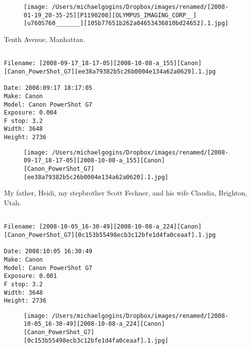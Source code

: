\documentclass[11pt,letter,DIV=14,paper=landscape]{scrbook}
\begin{document}
\begin{figure}
\texttt{[image: /Users/michaelgogins/Dropbox/images/renamed/[2008-01-19\_20-35-25][P1190200][OLYMPUS\_IMAGING\_CORP\_\_][u760S760\_\_\_\_\_\_\_][105b77651b262a04653436810bd24652].1.jpg]}
\end{figure}
    
\clearpage
\noindent Tenth Avenue, Manhattan.
\noindent
\begin{lstlisting}

Filename: [2008-09-17_18-17-05][2008-10-08-a_155][Canon][Canon_PowerShot_G7][ee38a79382b5c26b0004e134a62a0620].1.jpg

Date: 2008:09:17 18:17:05
Make: Canon
Model: Canon PowerShot G7
Exposure: 0.004
F stop: 3.2
Width: 3648
Height: 2736
\end{lstlisting}
\clearpage

\begin{figure}
\texttt{[image: /Users/michaelgogins/Dropbox/images/renamed/[2008-09-17\_18-17-05][2008-10-08-a\_155][Canon][Canon\_PowerShot\_G7][ee38a79382b5c26b0004e134a62a0620].1.jpg]}
\end{figure}
    
\clearpage
\noindent My father, Heidi, my stepbrother Scott Fechner, and his wife Claudia, Brighton, Utah.
\noindent
\begin{lstlisting}

Filename: [2008-10-05_16-30-49][2008-10-08-a_224][Canon][Canon_PowerShot_G7][0c153b55498ecb3c12bfe1d4fa0ceaaf].1.jpg

Date: 2008:10:05 16:30:49
Make: Canon
Model: Canon PowerShot G7
Exposure: 0.001
F stop: 3.2
Width: 3648
Height: 2736
\end{lstlisting}
\clearpage

\begin{figure}
\texttt{[image: /Users/michaelgogins/Dropbox/images/renamed/[2008-10-05\_16-30-49][2008-10-08-a\_224][Canon][Canon\_PowerShot\_G7][0c153b55498ecb3c12bfe1d4fa0ceaaf].1.jpg]}
\end{figure}
    
\end{document}
